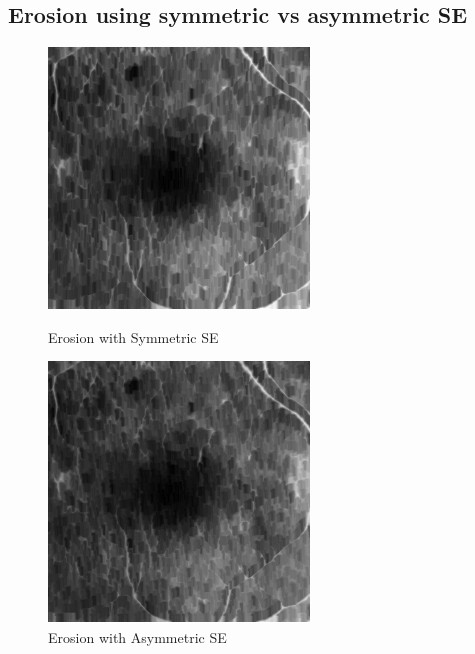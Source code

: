 \documentclass{article}
\begin{document}
\subsection{Erosion using symmetric vs asymmetric SE}
\vspace{8mm}
\begin{figure}[ht!] 
  \label{ fig7} 
  \begin{minipage}[b]{0.5\linewidth}
    \centering
    \includegraphics[width=.95\linewidth]{eroSym.png} 
    \caption{Erosion with Symmetric SE} 
    \vspace{4ex}
  \end{minipage}%
  \begin{minipage}[b]{0.5\linewidth}
    \centering
    \includegraphics[width=.95\linewidth]{eroAsym.png} 
    \caption{Erosion with Asymmetric SE} 
    \vspace{4ex}
  \end{minipage} 
 \end{figure}
\end{document}

